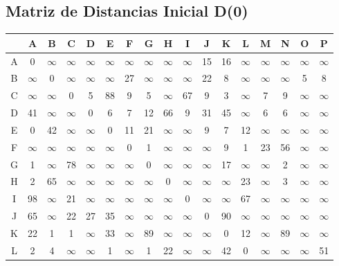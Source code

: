 \documentclass[12pt]{article}
\begin{document}
\subsection{Matriz de Distancias Inicial D(0)}
\begin{table}[h!]
\centering
\begin{tabular}{|c|c|c|c|c|c|c|c|c|c|c|c|c|c|c|c|c|}
\hline
 & A & B & C & D & E & F & G & H & I & J & K & L & M & N & O & P \\\hline
A & 0 & $\infty$ & $\infty$ & $\infty$ & $\infty$ & $\infty$ & $\infty$ & $\infty$ & $\infty$ & 15 & 16 & $\infty$ & $\infty$ & $\infty$ & $\infty$ & $\infty$ \\\hline
B & $\infty$ & 0 & $\infty$ & $\infty$ & $\infty$ & 27 & $\infty$ & $\infty$ & $\infty$ & 22 & 8 & $\infty$ & $\infty$ & $\infty$ & 5 & 8 \\\hline
C & $\infty$ & $\infty$ & 0 & 5 & 88 & 9 & 5 & $\infty$ & 67 & 9 & 3 & $\infty$ & 7 & 9 & $\infty$ & $\infty$ \\\hline
D & 41 & $\infty$ & $\infty$ & 0 & 6 & 7 & 12 & 66 & 9 & 31 & 45 & $\infty$ & 6 & 6 & $\infty$ & $\infty$ \\\hline
E & 0 & 42 & $\infty$ & $\infty$ & 0 & 11 & 21 & $\infty$ & $\infty$ & 9 & 7 & 12 & $\infty$ & $\infty$ & $\infty$ & $\infty$ \\\hline
F & $\infty$ & $\infty$ & $\infty$ & $\infty$ & $\infty$ & 0 & 1 & $\infty$ & $\infty$ & $\infty$ & 9 & 1 & 23 & 56 & $\infty$ & $\infty$ \\\hline
G & 1 & $\infty$ & 78 & $\infty$ & $\infty$ & $\infty$ & 0 & $\infty$ & $\infty$ & $\infty$ & 17 & $\infty$ & $\infty$ & 2 & $\infty$ & $\infty$ \\\hline
H & 2 & 65 & $\infty$ & $\infty$ & $\infty$ & $\infty$ & $\infty$ & 0 & $\infty$ & $\infty$ & $\infty$ & 23 & $\infty$ & 3 & $\infty$ & $\infty$ \\\hline
I & 98 & $\infty$ & 21 & $\infty$ & $\infty$ & $\infty$ & $\infty$ & $\infty$ & 0 & $\infty$ & $\infty$ & 67 & $\infty$ & $\infty$ & $\infty$ & $\infty$ \\\hline
J & 65 & $\infty$ & 22 & 27 & 35 & $\infty$ & $\infty$ & $\infty$ & $\infty$ & 0 & 90 & $\infty$ & $\infty$ & $\infty$ & $\infty$ & $\infty$ \\\hline
K & 22 & 1 & 1 & $\infty$ & 33 & $\infty$ & 89 & $\infty$ & $\infty$ & $\infty$ & 0 & 12 & $\infty$ & 89 & $\infty$ & $\infty$ \\\hline
L & 2 & 4 & $\infty$ & $\infty$ & 1 & $\infty$ & 1 & 22 & $\infty$ & $\infty$ & 42 & 0 & $\infty$ & $\infty$ & $\infty$ & 51 \\\hline

\end{tabular}
\end{table}
\end{document}
